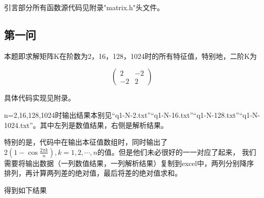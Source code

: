 \documentclass[10pt, a4paper]{article}
\begin{document}
    引言部分所有函数源代码见附录"matrix.h"头文件。

    \subsection{第一问}

    本题即求解矩阵K在阶数为2，16，128，1024时的所有特征值，特别地，二阶K为

    \[\begin{pmatrix}
        2&-2\\
        -2&2
    \end{pmatrix}\]

    具体代码实现见附录。

    n=2,16,128,1024时输出结果本别见“q1-N-2.txt”“q1-N-16.txt”“q1-N-128.txt”“q1-N-1024.txt”。其中左列是数值结果，右侧是解析结果。

    特别的是，代码中在输出本征值数组时，同时输出了$2(1-\cos\frac{2\pi k}{n}),k=1,2,\cdots,n $的值。但是他们未必很好的一一对应了起来，
    我们需要将输出数据（一列数值结果，一列解析结果）复制到excel中，两列分别降序排列，再计算两列差的绝对值，最后将差的绝对值求和。

    得到如下结果
\end{document}
